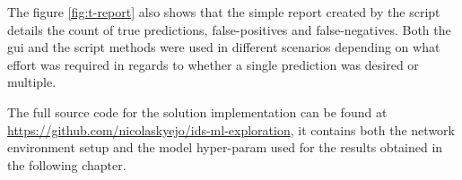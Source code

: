 The figure \ref{fig:t-report} also shows that the simple report created by the script details the count of true predictions, \gls{false-positive}s and \gls{false-negative}s.
Both the \gls{gui} and the script methods were used in different scenarios depending on what effort was required in regards to whether a single prediction was desired or multiple.

The full source code for the solution implementation can be found at \href{https://github.com/nicolaskyejo/ids-ml-exploration}{https://github.com/nicolaskyejo/ids-ml-exploration},
it contains both the network environment setup and the model \gls{hyper-param} used for the results obtained in the following chapter.
